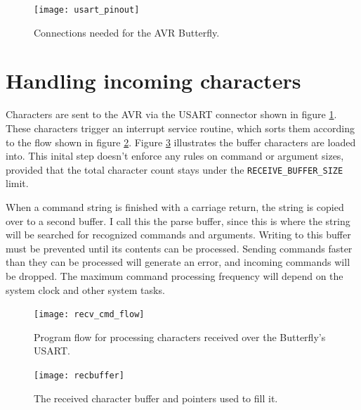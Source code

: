 \begin{figure}[ht]
    \begin{center}
        \texttt{[image: usart\_pinout]}
        \caption{Connections needed for the AVR Butterfly.\label{fig:connections}}
    \end{center}
\end{figure}

\clearpage
\section{Handling incoming characters}
Characters are sent to the AVR via the USART connector shown in figure \ref{fig:connections}.  These characters trigger an interrupt service routine, which sorts them according to the flow shown in figure \ref{fig:recflow}.  Figure \ref{fig:recbuffer} illustrates the buffer characters are loaded into.  This inital step doesn't enforce any rules on command or argument sizes, provided that the total character count stays under the \texttt{RECEIVE\_BUFFER\_SIZE} limit.

When a command string is finished with a carriage return, the string is copied over to a second buffer.  I call this the parse buffer, since this is where the string will be searched for recognized commands and arguments.  Writing to this buffer must be prevented until its contents can be processed.  Sending commands faster than they can be processed will generate an error, and incoming commands will be dropped.  The maximum command processing frequency will depend on the system clock and other system tasks.  

\begin{figure}[ht]
    \begin{center}
        \texttt{[image: recv\_cmd\_flow]}
        \caption{Program flow for processing characters received over the Butterfly's USART.\label{fig:recflow}}
    \end{center}
\end{figure}

\begin{figure}[ht]
    \begin{center}
        \texttt{[image: recbuffer]}
        \caption{The received character buffer and pointers used to fill it.\label{fig:recbuffer}}
    \end{center}
\end{figure}

